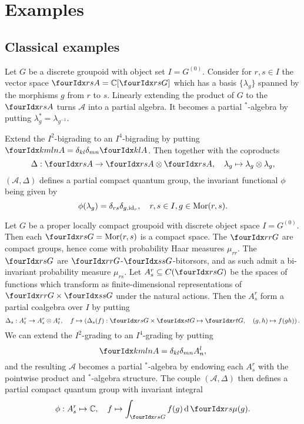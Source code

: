 
\section{Examples}

\subsection{Classical examples}

\begin{Exa} Let $G$ be a discrete groupoid with object set $I = G^{(0)}$. Consider for $r,s\in I$ the vector space $\Gru{A}{r}{s}= \mathbb{C}\lbrack \Gru{G}{r}{s}\rbrack$ which has a basis $\{\lambda_g\}$ spanned by the morphisms $g$ from $r$ to $s$. Linearly extending the product of $G$ to the $\Gru{A}{r}{s}$ turns $\mathscr{A}$ into a partial algebra. It becomes a partial $^*$-algebra by putting $\lambda_g^* = \lambda_{g^{-1}}$. 

Extend the $I^2$-bigrading to an $I^4$-bigrading by putting $\Gr{A}{k}{l}{m}{n} = \delta_{kl}\delta_{mn}\Gru{A}{k}{l}$. Then together with the coproducts \[ \Delta: \Gru{A}{r}{s}\rightarrow \Gru{A}{r}{s}\otimes \Gru{A}{r}{s},\quad \lambda_g\mapsto \lambda_g\otimes \lambda_g,\] $(\mathscr{A},\Delta)$ defines a partial compact quantum group, the invariant functional $\phi$ being given by \[\phi(\lambda_g) = \delta_{rs}\delta_{g,\operatorname{id}_r},\quad r,s\in I,g\in \mathrm{Mor}(r,s).\]
\end{Exa}

\begin{Exa} Let $G$ be a proper locally compact groupoid with discrete object space $I=G^{(0)}$. Then each $\Gru{G}{r}{s} = \Mor(r,s)$ is a compact space. The $\Gru{G}{r}{r}$ are compact groups, hence come with probability Haar measures $\mu_{rr}$. The $\Gru{G}{r}{s}$ are $\Gru{G}{r}{r}$-$\Gru{G}{s}{s}$-bitorsors, and as such admit a bi-invariant probability measure $\mu_{rs}$. Let $A^r_s \subseteq C(\Gru{G}{r}{s})$ be the spaces of functions which transform as finite-dimensional representations of $\Gru{G}{r}{r}\times \Gru{G}{s}{s}$ under the natural actions. Then the $A^r_s$ form a partial coalgebra over $I$ by putting \[\Delta_{s}: A^r_t \rightarrow A^r_s\otimes A^s_t,\quad f\mapsto \left(\Delta_s(f):\Gru{G}{r}{s}\times \Gru{G}{s}{t}\mapsto \Gru{G}{r}{t},\quad (g,h)\mapsto f(gh)\right).\] We can extend the $I^2$-grading to an $I^4$-grading by putting \[\Gr{A}{k}{l}{m}{n} = \delta_{kl}\delta_{mn} A^l_n,\] and the resulting $\mathscr{A}$ becomes a partial $^*$-algebra by endowing each $A^r_s$ with the pointwise product and $^*$-algebra structure. The couple $(\mathscr{A},\Delta)$ then defines a partial compact quantum group with invariant integral \[\phi: A^r_s \mapsto \C,\quad f\mapsto \int_{\Gru{G}{r}{s}} f(g) \rd \Gru{\mu}{r}{s}(g).\]

\end{Exa}

